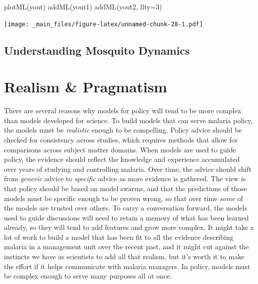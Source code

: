 \documentclass[
]{book}
\newenvironment{Shaded}{\begin{snugshade}}{\end{snugshade}}
\newcommand{\AttributeTok}[1]{\textcolor[rgb]{0.77,0.63,0.00}{#1}}
\newcommand{\DecValTok}[1]{\textcolor[rgb]{0.00,0.00,0.81}{#1}}
\newcommand{\FunctionTok}[1]{\textcolor[rgb]{0.00,0.00,0.00}{#1}}
\newcommand{\NormalTok}[1]{#1}
\begin{document}
\begin{Shaded}
\begin{Highlighting}[]
\FunctionTok{plotML}\NormalTok{(yout)}
\FunctionTok{addML}\NormalTok{(yout1)}
\FunctionTok{addML}\NormalTok{(yout2, }\AttributeTok{llty=}\DecValTok{3}\NormalTok{)}
\end{Highlighting}
\end{Shaded}

\texttt{[image: \_main\_files/figure-latex/unnamed-chunk-28-1.pdf]}

\hypertarget{understanding-mosquito-dynamics}{%
\section{Understanding Mosquito Dynamics}\label{understanding-mosquito-dynamics}}

\hypertarget{realism-pragmatism}{%
\chapter{Realism \& Pragmatism}\label{realism-pragmatism}}

There are several reasons why models for policy will tend to be more complex than models developed for science. To build models that can serve malaria policy, the models must be \emph{realistic} enough to be compelling. Policy advice should be checked for consistency across studies, which requires methods that allow for comparisons across subject matter domains. When models are used to guide policy, the evidence should reflect the knowledge and experience accumulated over years of studying and controlling malaria. Over time, the advice should shift from \emph{generic} advice to \emph{specific} advice as more evidence is gathered. The view is that policy should be based on model swarms, and that the predictions of those models must be specific enough to be proven wrong, so that over time \emph{some} of the models are trusted over others. To carry a conversation forward, the models used to guide discussions will need to retain a memory of what has been learned already, so they will tend to add features and grow more complex. It might take a lot of work to build a model that has been fit to all the evidence describing malaria in a management unit over the recent past, and it might cut against the instincts we have as scientists to add all that realism, but it's worth it to make the effort if it helps communicate with malaria managers. In policy, models must be complex enough to serve many purposes all at once.
\end{document}
